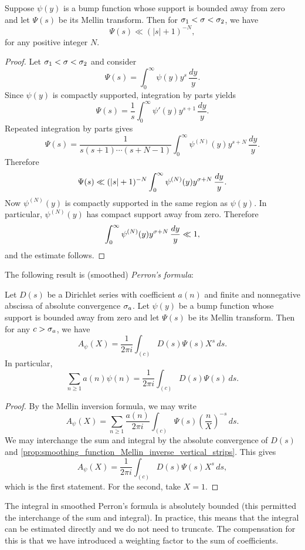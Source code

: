 \documentclass[12pt]{article}
\begin{document}
    \begin{proposition}\label{prop:smoothing_function_Mellin_inverse_vertical_strips}
      Suppose \(\psi(y)\) is a bump function whose support is bounded away from zero and let \(\Psi(s)\) be its Mellin transform. Then for \(\sigma_{1} < \sigma < \sigma_{2}\), we have
      \[
        \Psi(s) \ll (|s|+1)^{-N},
      \]
      for any positive integer \(N\).
    \end{proposition}
    \begin{proof}
      Let \(\sigma_{1} < \sigma < \sigma_{2}\) and consider
      \[
        \Psi(s) = \int_{0}^{\infty}\psi(y)y^{s}\,\frac{dy}{y}.
      \]
      Since \(\psi(y)\) is compactly supported, integration by parts yields
      \[
        \Psi(s) = \frac{1}{s}\int_{0}^{\infty}\psi'(y)y^{s+1}\,\frac{dy}{y}.
      \]
      Repeated integration by parts gives
      \[
        \Psi(s) = \frac{1}{s(s+1) \cdots (s+N-1)}\int_{0}^{\infty}\psi^{(N)}(y)y^{s+N}\,\frac{dy}{y}.
      \]
      Therefore
      \[
        \Psi(s) \ll (|s|+1)^{-N}\int_{0}^{\infty}\psi^{(N)}(y)y^{\sigma+N}\,\frac{dy}{y}.
      \]
      Now \(\psi^{(N)}(y)\) is compactly supported in the same region as \(\psi(y)\). In particular, \(\psi^{(N)}(y)\) has compact support away from zero. Therefore
      \[
        \int_{0}^{\infty}\psi^{(N)}(y)y^{\sigma+N}\,\frac{dy}{y} \ll 1,
      \]
      and the estimate follows.
    \end{proof}
    
    The following result is (smoothed) \textit{Perron's formula}:

    \begin{theorem*}
      Let \(D(s)\) be a Dirichlet series with coefficient \(a(n)\) and finite and nonnegative abscissa of absolute convergence \(\sigma_{a}\). Let \(\psi(y)\) be a bump function whose support is bounded away from zero and let \(\Psi(s)\) be its Mellin transform. Then for any \(c > \sigma_{a}\), we have
      \[
        A_{\psi}(X) = \frac{1}{2\pi i}\int_{(c)}D(s)\Psi(s)X^{s}\,ds.
      \]
      In particular,
      \[
        \sum_{n \ge 1}a(n)\psi(n) = \frac{1}{2\pi i}\int_{(c)}D(s)\Psi(s)\,ds.
      \]
    \end{theorem*}
    \begin{proof}
      By the Mellin inversion formula, we may write
      \[
        A_{\psi}(X) = \sum_{n \ge 1}\frac{a(n)}{2\pi i}\int_{(c)}\Psi(s)\left(\frac{n}{X}\right)^{-s}\,ds.
      \]
      We may interchange the sum and integral by the absolute convergence of \(D(s)\) and \cref{prop:smoothing_function_Mellin_inverse_vertical_strips}. This gives
      \[
        A_{\psi}(X) = \frac{1}{2\pi i}\int_{(c)}D(s)\Psi(s)X^{s}\,ds,
      \]
      which is the first statement. For the second, take \(X = 1\).
    \end{proof}

    The integral in smoothed Perron's formula is absolutely bounded (this permitted the interchange of the sum and integral). In practice, this means that the integral can be estimated directly and we do not need to truncate. The compensation for this is that we have introduced a weighting factor to the sum of coefficients.
\end{document}
